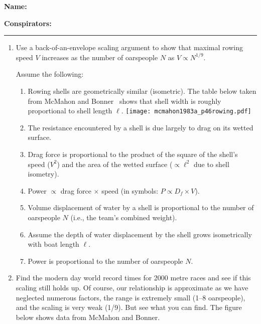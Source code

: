 \textbf{Name:} \\

\medskip

\textbf{Conspirators:} 

\medskip
\medskip

\hrule

\medskip




\begin{enumerate}

\item

  Use a back-of-an-envelope scaling argument to
  show that maximal rowing speed $V$ increases 
  as the number of oarspeople $N$ as $V \propto N^{1/9}$.

  Assume the following:
  \begin{enumerate}
  \item
    Rowing shells are geometrically similar (isometric).
    The table below taken from McMahon and Bonner~\cite{mcmahon1983a} shows that
    shell width is roughly proportional to shell length $\ell$.
    \texttt{[image: mcmahon1983a\_p46rowing.pdf]}
  \item
    The resistance encountered by a shell is due largely to 
    drag on its wetted surface.
  \item
    Drag force is proportional to the product of the square
    of the shell's speed ($V^2$) and the area of the wetted surface ($\propto \ell^2$
    due to shell isometry).
  \item
    Power $\propto$ drag force $\times$ speed (in symbols: $P \propto D_f \times V$).
  \item
    Volume displacement of water by a shell is proportional to the number of oarspeople $N$
    (i.e., the team's combined weight).
  \item
    Assume the depth of water displacement by the shell grows isometrically
    with boat length $\ell$.
  \item Power is proportional to the number of oarspeople $N$.
  \end{enumerate}


   \solutionstart


   \solutionend


\item
  Find the modern day world record times for 2000 metre races
  and see if this scaling still holds up.  Of course, our 
  relationship is approximate as we have neglected numerous
  factors, the range is extremely
  small (1--8 oarspeople), and the scaling is very weak (1/9).
  But see what you can find. The figure below 
  shows data from McMahon and Bonner.


\end{enumerate}
